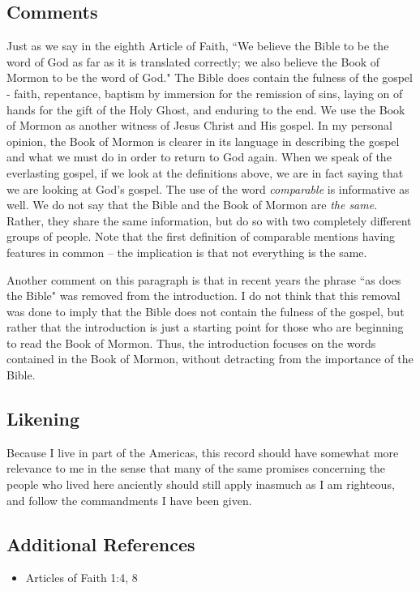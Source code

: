 \documentclass[12pt]{report}
\begin{document}
\subsection{Comments\label{intro:comments1}}
Just as we say in the eighth Article of Faith, ``We believe the Bible to be the word of God as far as it is translated correctly; we also believe the Book of Mormon to be the word of God."  The Bible does contain the fulness of the gospel - faith, repentance, baptism by immersion for the remission of sins, laying on of hands for the gift of the Holy Ghost, and enduring to the end.  We use the Book of Mormon as another witness of Jesus Christ and His gospel.  In my personal opinion, the Book of Mormon is clearer in its language in describing the gospel and what we must do in order to return to God again.  When we speak of the everlasting gospel, if we look at the definitions above, we are in fact saying that we are looking at God's gospel.  The use of the word \emph{comparable} is informative as well.  We do not say that the Bible and the Book of Mormon are \emph{the same}.  Rather, they share the same information, but do so with two completely different groups of people.  Note that the first definition of comparable mentions having features in common -- the implication is that not everything is the same.

Another comment on this paragraph is that in recent years the phrase ``as does the Bible" was removed from the introduction.  I do not think that this removal was done to imply that the Bible does not contain the fulness of the gospel, but rather that the introduction is just a starting point for those who are beginning to read the Book of Mormon.  Thus, the introduction focuses on the words contained in the Book of Mormon, without detracting from the importance of the Bible.

\subsection{Likening\label{intro:likening1}}
Because I live in part of the Americas, this record should have somewhat more relevance to me in the sense that many of the same promises concerning the people who lived here anciently should still apply inasmuch as I am righteous, and follow the commandments I have been given.

\subsection{Additional References\label{intro:references1}}
\begin{itemize}
\item Articles of Faith 1:4, 8
\end{itemize}
\end{document}
